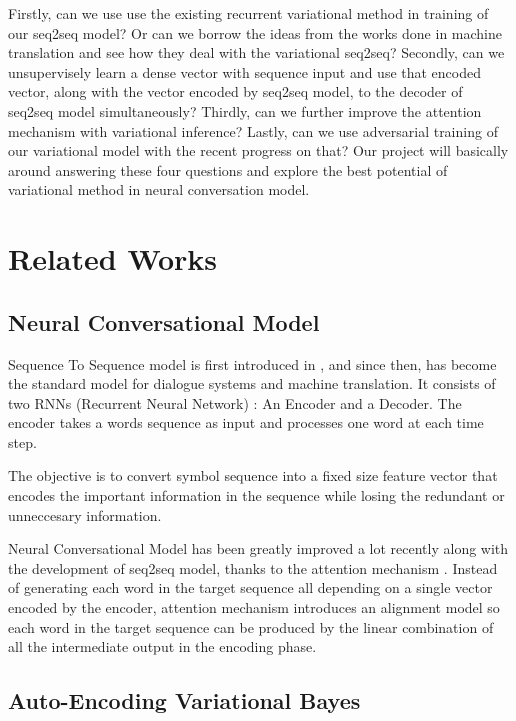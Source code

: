 \documentclass{article}
\begin{document}
 Firstly, can we use use the existing recurrent variational method \cite{vrnn} in training of our seq2seq model? Or can we borrow the ideas from the works done in machine translation \cite{vnmt} and see how they deal with the variational seq2seq? Secondly, can we unsupervisely learn a dense vector with sequence input \cite{vrae} and use that encoded vector, along with the vector encoded by seq2seq model, to the decoder of seq2seq model simultaneously? Thirdly, can we further improve the attention mechanism with variational inference? Lastly, can we use adversarial training of our variational model with the recent progress on that? Our project will basically around answering these four questions and explore the best potential of variational method in neural conversation model.

\section{Related Works}

\subsection{Neural Conversational Model}

Sequence To Sequence model is first introduced in \cite{seq2seq}, and since then, has become the standard model for dialogue systems \cite{ncm} and machine translation. It consists of two RNNs (Recurrent Neural Network) : An Encoder and a Decoder. The encoder takes a words sequence as input and processes one word at each time step. 

The objective is to convert symbol sequence into a fixed size feature vector that encodes the important information in the sequence while losing the redundant or unneccesary information.

Neural Conversational Model has been greatly improved a lot recently along with the development of seq2seq model, thanks to the attention mechanism \cite{attention}. Instead of generating each word in the target sequence all depending on a single vector encoded by the encoder, attention mechanism introduces an alignment model so each word in the target sequence can be produced by the linear combination of all the intermediate output in the encoding phase. 

\subsection{Auto-Encoding Variational Bayes}
\end{document}
